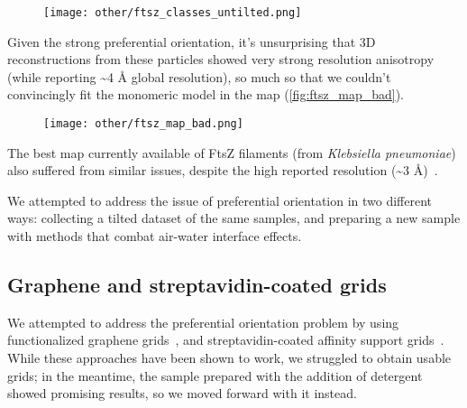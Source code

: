 \begin{figure}[ht]
    \centering
    \texttt{[image: other/ftsz\_classes\_untilted.png]}
    \label{fig:ftsz_classes}
\end{figure}

Given the strong preferential orientation, it's unsurprising that 3D reconstructions from these particles showed very strong resolution anisotropy (while reporting \sim4 Å global resolution), so much so that we couldn't convincingly fit the monomeric model in the map (\autoref{fig:ftsz_map_bad}).

\begin{figure}[ht]
    \centering
    \texttt{[image: other/ftsz\_map\_bad.png]}
    \label{fig:ftsz_map_bad}
\end{figure}

The best map currently available of FtsZ filaments (from \textit{Klebsiella pneumoniae}) also suffered from similar issues, despite the high reported resolution (\sim3 Å)~\cite{fujitaStructuresFtsZSingle2023}.

We attempted to address the issue of preferential orientation in two different ways: collecting a tilted dataset of the same samples, and preparing a new sample with methods that combat air-water interface effects.

\subsection{Graphene and streptavidin-coated grids}

We attempted to address the preferential orientation problem by using functionalized graphene grids~\cite{luFunctionalizedGrapheneGrids2022}, and streptavidin-coated affinity support grids~\cite{crucifixImmobilizationBiotinylatedDNA2004,hanLongShelflifeStreptavidin2016}.
While these approaches have been shown to work, we struggled to obtain usable grids; in the meantime, the sample prepared with the addition of detergent showed promising results, so we moved forward with it instead.

